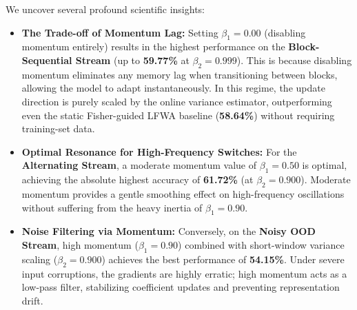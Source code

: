 \documentclass{article}
\theoremstyle{plain}
\theoremstyle{definition}
\theoremstyle{remark}
\begin{document}
We uncover several profound scientific insights:
\begin{itemize}
    \item \textbf{The Trade-off of Momentum Lag:} Setting $\beta_1 = 0.00$ (disabling momentum entirely) results in the highest performance on the \textbf{Block-Sequential Stream} (up to \textbf{59.77\%} at $\beta_2 = 0.999$). This is because disabling momentum eliminates any memory lag when transitioning between blocks, allowing the model to adapt instantaneously. In this regime, the update direction is purely scaled by the online variance estimator, outperforming even the static Fisher-guided LFWA baseline (\textbf{58.64\%}) without requiring training-set data.
    \item \textbf{Optimal Resonance for High-Frequency Switches:} For the \textbf{Alternating Stream}, a moderate momentum value of $\beta_1 = 0.50$ is optimal, achieving the absolute highest accuracy of \textbf{61.72\%} (at $\beta_2 = 0.900$). Moderate momentum provides a gentle smoothing effect on high-frequency oscillations without suffering from the heavy inertia of $\beta_1 = 0.90$.
    \item \textbf{Noise Filtering via Momentum:} Conversely, on the \textbf{Noisy OOD Stream}, high momentum ($\beta_1 = 0.90$) combined with short-window variance scaling ($\beta_2 = 0.900$) achieves the best performance of \textbf{54.15\%}. Under severe input corruptions, the gradients are highly erratic; high momentum acts as a low-pass filter, stabilizing coefficient updates and preventing representation drift.
\end{itemize}
\end{document}
